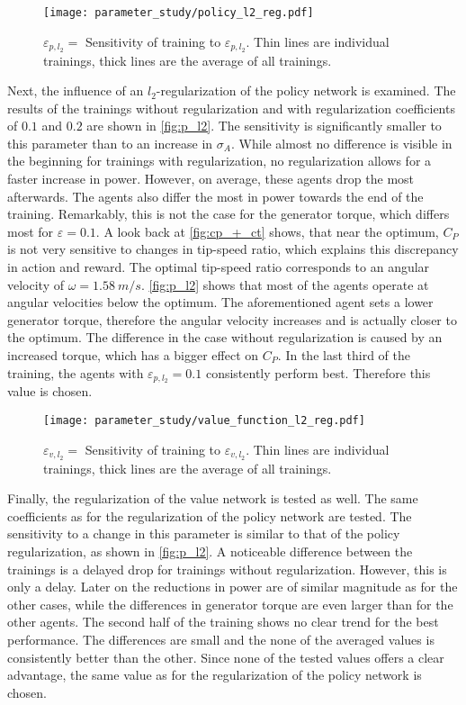 \begin{figure}[ht]
	\centering
	\texttt{[image: parameter\_study/policy\_l2\_reg.pdf]}
	\caption{$\varepsilon_{p,l_2}=$ Sensitivity of training to $\varepsilon_{p,l_2}$. Thin lines are individual trainings, thick lines are the average of all trainings.}
	\label{fig:p_l2}
\end{figure}
Next, the influence of an $l_2$-regularization of the policy network is examined. The results of the trainings without regularization and with regularization coefficients of $0.1$ and $0.2$ are shown in \autoref{fig:p_l2}. The sensitivity is significantly smaller to this parameter than to an increase in $\sigma_A$. While almost no difference is visible in the beginning for trainings with regularization, no regularization allows for a faster increase in power. However, on average, these agents drop the most afterwards. The agents also differ the most in power towards the end of the training. Remarkably, this is not the case for the generator torque, which differs most for $\varepsilon = 0.1$. A look back at \autoref{fig:cp_+_ct} shows, that near the optimum, $C_P$ is not very sensitive to changes in tip-speed ratio, which explains this discrepancy in action and reward. The optimal tip-speed ratio corresponds to an angular velocity of $\omega=\SI{1.58}{m/s}$. \autoref{fig:p_l2} shows that most of the agents operate at angular velocities below the optimum. The aforementioned agent sets a lower generator torque, therefore the angular velocity increases and is actually closer to the optimum. The difference in the case without regularization is caused by an increased torque, which has a bigger effect on $C_P$. In the last third of the training, the agents with $\varepsilon_{p,l_2}=0.1$ consistently perform best. Therefore this value is chosen. \\
\begin{figure}[h]%
	\centering
	\texttt{[image: parameter\_study/value\_function\_l2\_reg.pdf]}
	\caption{$\varepsilon_{v,l_2}=$ Sensitivity of training to $\varepsilon_{v,l_2}$. Thin lines are individual trainings, thick lines are the average of all trainings.}
	\label{fig:v_l2}
\end{figure}
Finally, the regularization of the value network is tested as well. The same coefficients as for the regularization of the policy network are tested. The sensitivity to a change in this parameter is similar to that of the policy regularization, as shown in \autoref{fig:p_l2}. A noticeable difference between the trainings is a delayed drop for trainings without regularization. However, this is only a delay. Later on the reductions in power are of similar magnitude as for the other cases, while the differences in generator torque are even larger than for the other agents. The second half of the training shows no clear trend for the best performance. The differences are small and the none of the averaged values is consistently better than the other. Since none of the tested values offers a clear advantage, the same value as for the regularization of the policy network is chosen.\\
